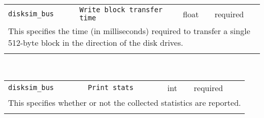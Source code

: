 \noindent 
\begin{tabular}{|p{1.5in}|p{3.5in}|p{0.5in}|p{0.5in}|}
\cline{1-4}
\texttt{disksim\_bus} & \texttt{Write block transfer time} & float & required \\ 
\cline{1-4}
\multicolumn{4}{|p{6in}|}{
This specifies the time (in milliseconds) required to transfer a single
512-byte block in the direction of the disk drives.
}\\ 
\cline{1-4}
\multicolumn{4}{p{5in}}{}\\
\end{tabular}\\ 
\noindent 
\begin{tabular}{|p{1.5in}|p{3.5in}|p{0.5in}|p{0.5in}|}
\cline{1-4}
\texttt{disksim\_bus} & \texttt{Print stats} & int & required \\ 
\cline{1-4}
\multicolumn{4}{|p{6in}|}{
This specifies whether or not the collected statistics are reported.
}\\ 
\cline{1-4}
\multicolumn{4}{p{5in}}{}\\
\end{tabular}\\ 
